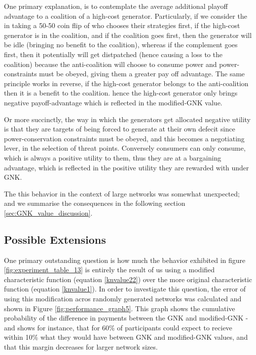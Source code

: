 One primary explanation, is to contemplate the average additional playoff advantage to a coalition of a high-cost generator.
Particularly, if we consider the in taking a 50-50 coin flip of who chooses their strategies first, if the high-cost generator is in the coalition, and if the coalition goes first, then the generator will be idle (bringing no benefit to the coalition), whereas if the complement goes first, then it potentially will get distpatched (hence causing a loss to the coalition) because the anti-coalition will choose to consume power and power-constraints must be obeyed, giving them a greater pay off advantage.
The same principle works in reverse, if the high-cost generator belongs to the anti-coalition then it is a benefit to the coalition.
hence the high-cost generator only brings negative payoff-advantage which is reflected in the modified-GNK value.

Or more succinctly, the way in which the generators get allocated negative utility is that they are targets of being forced to generate at their own defecit since power-conservation constraints must be obeyed, and this becomes a negotiating lever, in the selection of threat points.
Conversely consumers can only consume, which is always a positive utility to them, thus they are at a bargaining advantage, which is reflected in the positive utility they are rewarded with under GNK.

The this behavior in the context of large networks was somewhat unexpected; and we summarise the consequences in the following section \ref{sec:GNK_value_discussion}.

\subsection{Possible Extensions}\label{sec:GNK_extensions_discussion}

One primary outstanding question is how much the behavior exhibited in figure \ref{fig:experiment_table_13} is entirely the result of us using a modified characteristic function (equation \ref{knvalue22}) over the more original characteristic function (equation \ref{knvalue1}).
In order to investigate this question, the error of using this modification acros randomly generated networks was calculated and shown in Figure \ref{fig:performance_graph5}.
This graph shows the cumulative probability of the difference in payments between the GNK and modified-GNK - and shows for instance, that for 60\% of participants could expect to recieve within 10\% what they would have between GNK and modified-GNK values, and that this margin decreases for larger network sizes.


